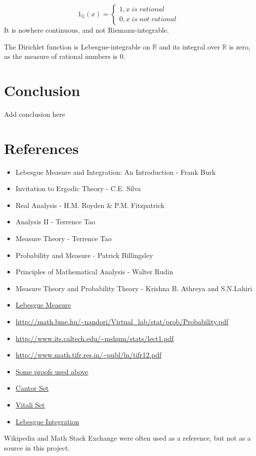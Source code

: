 \documentclass{article}
\begin{document}
\[ 1_{\mathbb{Q}}(x)=\begin{cases} 
    1 , x \;is\; rational \\
    0 , x \;is\; not\; rational
   \end{cases}
\]
 It is nowhere continuous, and not Riemann-integrable.\medskip
 
 The Dirichlet function is Lebesgue-integrable on $\mathbb{R}$ and its integral over $\mathbb{R}$ is zero, as the measure of rational numbers is 0.



\newpage
\section{Conclusion}
	Add conclusion here
\newpage
\section{References}
\begin{itemize}
    \item Lebesgue Measure and Integration: An Introduction - Frank Burk
    \item Invitation to Ergodic Theory - C.E. Silva
    \item Real Analysis - H.M. Royden \& P.M. Fitzpatrick
    \item Analysis II - Terrence Tao
    \item Measure Theory - Terrence Tao
    \item Probability and Measure - Patrick Billingsley
    \item Principles of Mathematical Analysis - Walter Rudin
    \item Measure Theory and Probability Theory - Krishna B. Athreya and S.N.Lahiri
    \item \href{https://en.wikipedia.org/wiki/Lebesgue_measure}{Lebesgue Measure}
    \item \url{http://math.bme.hu/~nandori/Virtual_lab/stat/prob/Probability.pdf}
    \item \url{http://www.its.caltech.edu/~mshum/stats/lect1.pdf}
    \item \url{http://www.math.tifr.res.in/~publ/ln/tifr12.pdf}
    \item \href{https://faculty.etsu.edu/gardnerr/5210/Beamer-Proofs/Proofs-2-2.pdf}{Some proofs used above}
    \item \href{https://en.wikipedia.org/wiki/Cantor_set}{Cantor Set}
    \item \href{https://en.wikipedia.org/wiki/Vitali_set}{Vitali Set}
    \item \href{https://en.wikipedia.org/wiki/Lebesgue_integration}{Lebesgue Integration}
    
\end{itemize}
Wikipedia and Math Stack Exchange were often used as a reference, but not as a source in this project.
\end{document}
